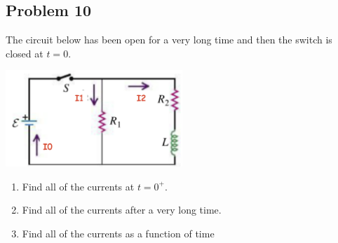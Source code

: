 \subsection*{Problem 10}
The circuit below has been open for a very long time and then the switch is closed at $t=0$.\\
\centerline{\includegraphics[width=0.5\textwidth]{Images/P10img1.png}}
\begin{enumerate}
    \item Find all of the currents at $t=0^+$.
    \item Find all of the currents after a very long time.
    \item Find all of the currents as a function of time
\end{enumerate}
